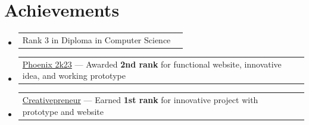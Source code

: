 \documentclass[a4paper,11pt]{article}
\makeatletter
\newcommand{\resumePOR}[3]{
\vspace{0.5mm}\item
    \begin{tabular*}{0.97\textwidth}[t]{l@{\extracolsep{\fill}}r}
        \textbf{#1}\hspace{0.3mm}#2 & \textit{\small{#3}}
    \end{tabular*}
    \vspace{-2mm}
}
\newcommand{\resumeSubHeadingListStart}{\begin{itemize}[leftmargin=*,labelsep=1mm]}
\newcommand{\resumeSubHeadingListEnd}{\end{itemize}\vspace{1mm}}
\makeatother
\begin{document}
\section{\textbf{Achievements}}
\vspace{-0.2mm}
\resumeSubHeadingListStart
\resumePOR{}{Rank 3 in Diploma in Computer Science}{}
\resumePOR{}{\href{https://drive.google.com/drive/folders/1Nt0_glk4B64tJG0jDHx0oZ2C355bHIxj?usp=sharing}{Phoenix 2k23} --- Awarded \textbf{2nd rank} for functional website, innovative idea, and working prototype}{}
\resumePOR{}{\href{https://drive.google.com/drive/folders/1X1FbNvyCMDfTDSZkzQ1-TPfU-WUTYp49?usp=sharing}{Creativepreneur} --- Earned \textbf{1st rank} for innovative project with prototype and website}{}
\resumeSubHeadingListEnd
\vspace{-5mm}
\end{document}
